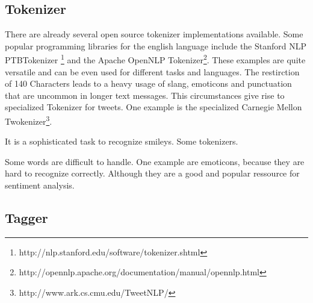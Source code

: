 \subsection{Tokenizer}
There are already several open source tokenizer implementations
available. Some popular programming libraries for the english 
language include the Stanford NLP PTBTokenizer
\footnote{http://nlp.stanford.edu/software/tokenizer.shtml} 
and the Apache OpenNLP Tokenizer\footnote{http://opennlp.apache.org/documentation/manual/opennlp.html}.
These examples are quite versatile and can be even 
used for different tasks and languages.
The restirction of 140 Characters leads to a heavy
usage of slang, emoticons and punctuation 
that are uncommon in longer text messages.\autocite{davies2011}
This circumstances give rise to specialized Tokenizer
for tweets. One example is the specialized Carnegie 
Mellon Twokenizer\footnote{http://www.ark.cs.cmu.edu/TweetNLP/}.


It is a sophisticated task to recognize smileys. Some tokenizers.

Some words are difficult to handle. One example are emoticons,
because they are hard to recognize correctly. Although they 
are a good and popular ressource for sentiment analysis. \autocite{emoticons}


\subsection{Tagger}
